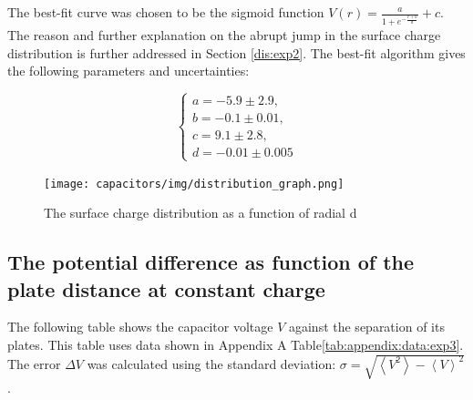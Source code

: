 The best-fit curve was chosen to be the sigmoid function $V(r) = \frac{a}{1 + e^{-\frac{r + b}{d}}} + c$. The reason and further explanation on the abrupt jump in the surface charge distribution is further addressed in Section \ref{dis:exp2}. The best-fit algorithm \cite{scipy} gives the following parameters and uncertainties:

\begin{equation*}
    \begin{cases}
        a = -5.9 \pm 2.9, \\
        b = -0.1 \pm 0.01, \\
        c = 9.1 \pm 2.8, \\
        d = -0.01 \pm 0.005
    \end{cases}
\end{equation*}

\begin{figure}[H]
    \centering
    \texttt{[image: capacitors/img/distribution\_graph.png]}
    \caption{The surface charge distribution as a function of radial d}
    \label{fig:results:exp2}
\end{figure}

\subsection{The potential difference as function of the plate distance at constant charge} \label{sec:results:exp3}

The following table shows the capacitor voltage $V$ against the separation of its plates. This table uses data shown in Appendix A Table\ref{tab:appendix:data:exp3}. The error $\Delta V$ was calculated using the standard deviation: $\sigma = \sqrt{\left<V^2\right> - \left<V\right>^2}$.

